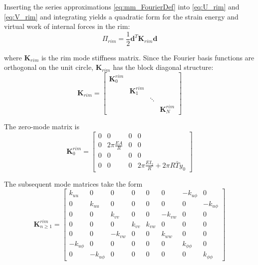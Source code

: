 \documentclass[\rootdir/thesis.tex]{subfiles}
\begin{document}
Inserting the series approximations \eqref{eq:mm_FourierDef} into \eqref{eq:U_rim} and \eqref{eq:V_rim} and integrating yields a quadratic form for the strain energy and virtual work of internal forces in the rim:
\begin{equation}
\label{eq:mm_U_rim}
\Pi_{rim} = \frac{1}{2} \mathbf{d}^T \mathbf{K}_{rim} \mathbf{d}
\end{equation}

where $\mathbf{K}_{rim}$ is the rim mode stiffness matrix. Since the Fourier basis functions are orthogonal on the unit circle, $\mathbf{K}_{rim}$ has the block diagonal structure:
\begin{equation}
\label{eq:mm_K_rim}
\mathbf{K}_{rim} =
\begin{bmatrix}
\mathbf{K}_0^{rim} & & &\\
& \mathbf{K}_1^{rim} & &\\
& & \ddots &\\
& & & \mathbf{K}_N^{rim}
\end{bmatrix}
\end{equation}

The zero-mode matrix is
\begin{equation}
\mathbf{K}_0^{rim} =
\begin{bmatrix}
0 & 0 & 0 & 0\\
0 & 2\pi \frac{EA}{R} & 0 & 0\\
0 & 0 & 0 & 0\\
0 & 0 & 0 & 2\pi \frac{EI_2}{R} + 2\pi R\bar{T}y_0
\end{bmatrix}
\end{equation}

The subsequent mode matrices take the form
\begin{equation}
\mathbf{K}_{n\geq 1}^{rim} =
\begin{bmatrix}
k_{uu} & 0 & 0 & 0 & 0 & 0 & -k_{u\phi} & 0\\
0 & k_{uu} & 0 & 0 & 0 & 0 & 0 & -k_{u\phi}\\
0 & 0 & k_{vv} & 0 & 0 & -k_{vw} & 0 & 0\\
0 & 0 & 0 & k_{vv} & k_{vw} & 0 & 0 & 0\\
0 & 0 & -k_{vw} & 0 & 0 & k_{ww} & 0 & 0\\
-k_{u\phi} & 0 & 0 & 0 & 0 & 0 & k_{\phi\phi} & 0\\
0 & -k_{u\phi} & 0 & 0 & 0 & 0 & 0 & k_{\phi\phi}
\end{bmatrix}
\end{equation}
\end{document}
